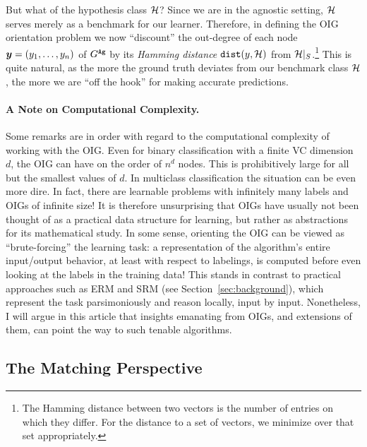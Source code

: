 But what of the hypothesis class $\mathcal{H}$? Since we are in the agnostic setting, $\mathcal{H}$ serves merely as a benchmark for our learner. Therefore, in defining the OIG orientation problem we now ``discount'' the out-degree of each node  $\boldsymbol{ y }=(y_1,\ldots,y_n)$ of $G^{\mathtt{Ag}}$ by its \emph{Hamming distance} $\mathtt{dist}(y,\mathcal{H})$ from $\mathcal{H}|_S$.\footnote{The Hamming distance between two vectors is the number of entries on which they differ. For the distance to a set of vectors, we minimize over that set appropriately.} %
This is quite natural, as the more the ground truth deviates from our benchmark class $\mathcal{H}$, the more we are ``off the hook'' for making accurate predictions. 



\paragraph{A Note on Computational Complexity.} Some remarks are in order with regard to the computational complexity of working with the OIG. Even for binary classification with a finite VC dimension $d$, the OIG can have on the order of $n^d$ nodes. This is prohibitively large for all but the smallest values of $d$. In multiclass classification the situation can be even more dire. In fact, there are learnable problems with infinitely many labels and  OIGs of infinite size! It is therefore unsurprising that OIGs have usually not been thought of as a practical data structure for learning, but rather as abstractions for its mathematical study. In some sense, orienting the OIG can be viewed as ``brute-forcing'' the learning task: a representation of the algorithm's entire input/output behavior, at least with respect to labelings, is computed before even looking at the labels in the training data!  This stands in contrast to practical approaches  such as ERM and SRM (see Section~\ref{sec:background}), %
which represent the task parsimoniously and reason locally, input by input. Nonetheless, I will argue in this article that insights emanating from OIGs, and extensions of them, can  point the way to such tenable algorithms.



\subsection{The Matching Perspective}
\label{subsec:matching}

